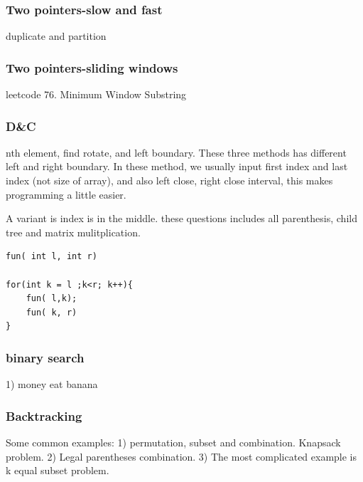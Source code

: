 \documentclass[a4paper,11pt,twoside]{book}
\begin{document}
\subsubsection{Two pointers-slow and fast}
	\par duplicate and partition

\subsubsection{Two pointers-sliding windows}
	\par leetcode 76. Minimum Window Substring

\subsubsection{D\&C}
	\par nth element, find rotate, and left boundary. These three methods has different left and right boundary.  In these method, we usually input first index and last index (not size of array), and also left close, right close interval, this makes programming a little easier. 

\par A variant is index is in the middle. these questions includes all parenthesis, child tree and matrix mulitplication.
\begin{lstlisting}
fun( int l, int r)

for(int k = l ;k<r; k++){
	fun( l,k);
	fun( k, r)
}				
\end{lstlisting}	

\subsubsection{binary search}
\par 1) money eat banana 

\subsubsection{Backtracking}

\par Some common examples:  1) permutation, subset and combination. Knapsack problem. 2) Legal parentheses combination. 3) The most complicated example is k equal subset problem. 
\end{document}
